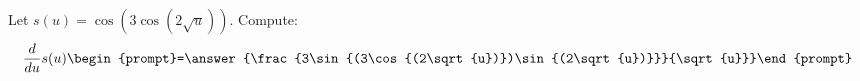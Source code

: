 \documentclass{ximera}
\author{Bart Snapp\and Nela Lakos}
\begin{document}
\begin{exercise}
Let $s(u) = \cos \left(3 \cos \left(2  \sqrt{u}\right)\right)$. Compute:
\[
\frac{d}{du}s(u)
\begin{prompt}=\answer{\frac{3\sin{(3\cos{(2\sqrt{u})})\sin{(2\sqrt{u})}}}{\sqrt{u}}}\end{prompt}
\]
\end{exercise}
\end{document}
